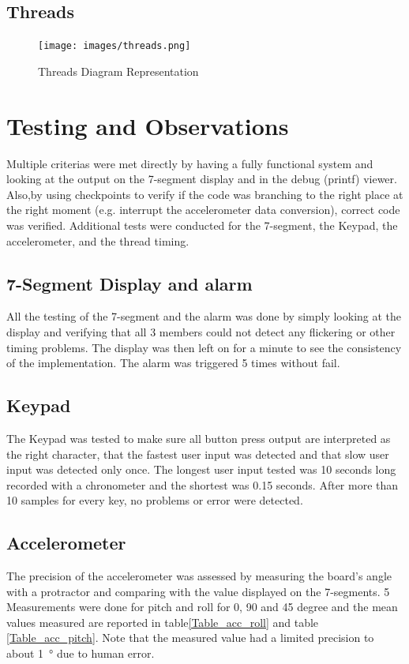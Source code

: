 ﻿\documentclass[12pt]{article}
\begin{document}
\subsection{Threads}

\begin{figure}[!htb]
 \centering
 \texttt{[image: images/threads.png]}
 \caption{Threads Diagram Representation}
 \label{fig:threads}
\end{figure}


\section{Testing and Observations}
Multiple criterias were met directly by having a fully functional system and looking at the output on the 7-segment display and in the debug (printf) viewer. Also,by using checkpoints to verify if the code was branching to the right place at the right moment (e.g. interrupt the accelerometer data conversion), correct code was verified. Additional tests were conducted for the 7-segment, the Keypad, the accelerometer, and the thread timing.

\subsection{7-Segment Display and alarm}
All the testing of the 7-segment and the alarm was done by simply looking at the display and verifying that all 3 members could not detect any flickering or other timing problems. The display was then left on for a minute to see the consistency of the implementation. The alarm was triggered 5 times without fail.
\subsection{Keypad}
The Keypad was tested to make sure all button press output are interpreted as the right character, that the fastest user input was detected and that slow user input was detected only once. The longest user input tested was 10 seconds long recorded with a chronometer and the shortest was 0.15 seconds. After more than 10 samples for every key, no problems or error were detected. 

\subsection{Accelerometer}
The precision of the accelerometer was assessed by measuring the board's angle with a protractor and comparing with the value displayed on the 7-segments. 5 Measurements were done for pitch and roll for 0, 90 and 45 degree and the mean values measured are reported in table\ref{Table_acc_roll} and table  \ref{Table_acc_pitch}. Note that the measured value had a limited precision to about \SI{1}{\degree} due to human error.
\end{document}
